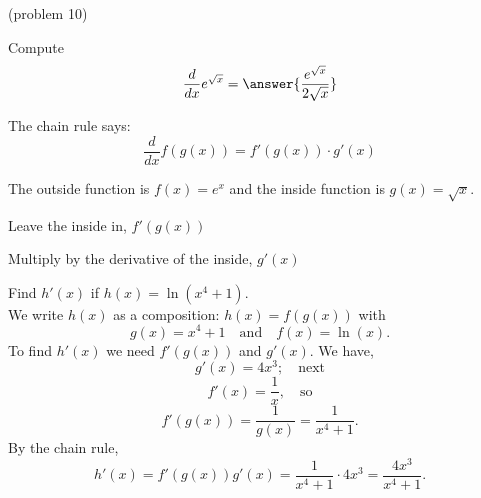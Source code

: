 \documentclass{ximera}
\begin{document}
\begin{center}
\begin{foldable}
\end{foldable}
\end{center}
 

\begin{problem}(problem 10)

Compute
  \[
  \frac{d}{dx} e^{\sqrt x} = \answer{\frac{e^{\sqrt x}}{2\sqrt x}}
  \]
  
    \begin{hint}
      The chain rule says:
      \[
      \frac{d}{dx} f(g(x)) = f'(g(x))\cdot g'(x)
      \]
    \end{hint}
    \begin{hint}
      The outside function is $f(x) = e^x$ and the inside
      function is $g(x) = \sqrt x$.
    \end{hint}
    \begin{hint}
		  Leave the inside in, $f'(g(x))$
		\end{hint}
		\begin{hint}
		  Multiply by the derivative of the inside, $g'(x)$
		\end{hint}
		
\end{problem}



\begin{example}[example 11]
Find $h'(x)$ if $h(x) = \ln(x^4 +1)$.\\
We write $h(x)$ as a composition: $h(x)=f(g(x))$ with 
\[g(x) = x^4 + 1  \quad \text{and} \quad  f(x) = \ln(x).\]
 To find $h'(x)$ we need $f'(g(x))$ and $g'(x)$.  We have, 
\[g'(x) = 4x^3; \quad \text{next} \] 
\[f'(x) = \frac{1}{x}, \quad \text{so}\]
\[ f'(g(x)) =\frac{1}{g(x)} = \frac{1}{x^4 + 1} .\]
By the chain rule,
\[h'(x) = f'(g(x))g'(x) = \frac{1}{x^4 + 1} \cdot 4x^3 = \frac{4x^3}{x^4 + 1}.\]
\end{example}

\begin{center}
\begin{foldable}
\end{foldable}
\end{center}
 
\end{document}
